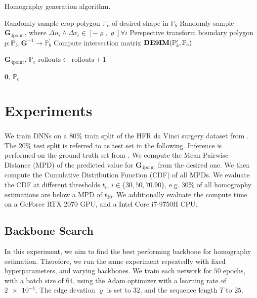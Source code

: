 \begin{algorithm}
    \caption{Homography generation algorithm.}
    \label{c3:alg:hom}
    \begin{algorithmic}
        \State Randomly sample crop polygon $\mathbb{P}_c$ of desired shape in $\mathbb{P}_b$\;
        \State Randomly sample $\mathbf{G}_{4\text{point}}$, where $\Delta u_i \land \Delta v_i \in \left[-\varrho, \varrho\right] \forall i$\;
        \State Perspective transform boundary polygon $p: \mathbb{P}_b, \mathbf{G}^{-1}\rightarrow\mathbb{P}^\prime_b$\;
        \State Compute intersection matrix $\operatorname{\mathbf{DE9IM}}(\mathbb{P}^\prime_b, \mathbb{P}_c)$\;
            
            \Return $\mathbf{G}_{4\text{point}}$, $\mathbb{P}_c$
        \EndIf
        \State $\text{rollouts} \gets \text{rollouts} + 1$
        \EndWhile
        
        \Return $\mathbf{0}$, $\mathbb{P}_c$
    \end{algorithmic}
\end{algorithm}

\section{Experiments}
We train DNNs on a $80\%$ train split of the HFR da Vinci\textsuperscript{\textregistered} surgery dataset from . The $20\%$ test split is referred to as test set in the following. Inference is performed on the ground truth set from . We compute the Mean Pairwise Distance (MPD) of the predicted value for $\mathbf{G}_{4\text{point}}$ from the desired one. We then compute the Cumulative Distribution Function (CDF) of all MPDs. We evaluate the CDF at different thresholds $t_i,\,i\in\{30,50,70.90\}$, e.g. $30\%$ of all homography estimations are below a MPD of $t_{30}$. We additionally evaluate the compute time on a GeForce RTX 2070 GPU, and a Intel Core i7-9750H CPU.

\subsection{Backbone Search}
In this experiment, we aim to find the best performing backbone for homography estimation. Therefore, we run the same experiment repeatedly with fixed hyperparameters, and varying backbones. We train each network for $50$ epochs, with a batch size of $64$, using the Adam optimizer with a learning rate of $\num{2e-4}$. The edge devation $\varrho$ is set to $32$, and the sequence length $T$ to $25$.


